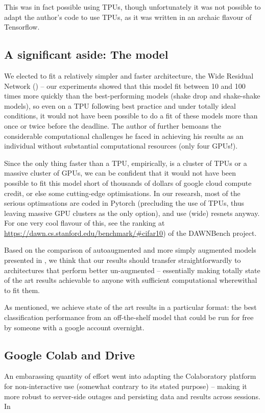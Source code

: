 \documentclass[10pt,twocolumn,letterpaper]{article}
\begin{document}
This was in fact possible using TPUs, though unfortunately it was not possible to adapt the \cite{Cubuk2018} author's code to use TPUs, as it was written in an archaic flavour of Tensorflow. 

\subsection{A significant aside: The model}
We elected to fit a relatively simpler and faster architecture, the Wide Residual Network (\cite{Zagoruyko2016}) -- our experiments showed that this model fit between 10 and 100 times more quickly than the best-performing models (shake drop and shake-shake models), so even on a TPU following best practice and under totally ideal conditions, it would not have been possible to do a fit of these models more than once or twice before the deadline. The author of \cite{Gastaldi2017} further bemoans the considerable computational challenges he faced in achieving his results as an individual without substantial computational resources (only four GPUs!). 

Since the only thing faster than a TPU, empirically, is a cluster of TPUs or a massive cluster of GPUs, we can be confident that it would not have been possible to fit this model short of thousands of dollars of google cloud compute credit, or else some cutting-edge optimisations. In our researsh, most of the serious optimsations are coded in Pytorch (precluding the use of TPUs, thus leaving massive GPU clusters as the only option), and use (wide) resnets anyway. For one very cool flavour of this, see the ranking at \url{https://dawn.cs.stanford.edu/benchmark/#cifar10}) of the \cite{Coleman2017} DAWNBench project. 

Based on the comparison of autoaugmented and more simply augmented models presented in \cite{Cubuk2018}, we think that our results should transfer straightforwardly to architectures that perform better un-augmented -- essentially making totally state of the art results achievable to anyone with sufficient computational wherewithal to fit them. 


As mentioned, we achieve state of the art results in a particular format: the best classification performance from an off-the-shelf model that could be run for free by someone with a google account overnight. 

\subsection{Google Colab and Drive}
An embarassing quantity of effort went into adapting the Colaboratory platform for non-interactive use (somewhat contrary to its stated purpose) -- making it more robust to server-side outages and persisting data and results across sessions. In 
\end{document}
